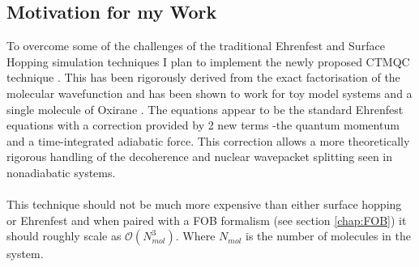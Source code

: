 \subsection{Motivation for my Work}
To overcome some of the challenges of the traditional Ehrenfest and Surface Hopping simulation techniques I plan to implement the newly proposed CTMQC technique \cite{agostini_quantum-classical_2016}. This has been rigorously derived from the exact factorisation of the molecular wavefunction \cite{abedi_exact_2010} and has been shown to work for toy model systems and a single molecule of Oxirane \cite{abedi_dynamical_2013, agostini_quantum-classical_2016}. The equations appear to be the standard Ehrenfest equations with a correction provided by 2 new terms -the quantum momentum and a time-integrated adiabatic force. This correction allows a more theoretically rigorous handling of the decoherence and nuclear wavepacket splitting seen in nonadiabatic systems.
\\\\
This technique should not be much more expensive than either surface hopping or Ehrenfest and when paired with a FOB formalism (see section \ref{chap:FOB}) it should roughly scale as $\mathcal{O}(N_{mol}^3)$. Where $N_{mol}$ is the number of molecules in the system. 
